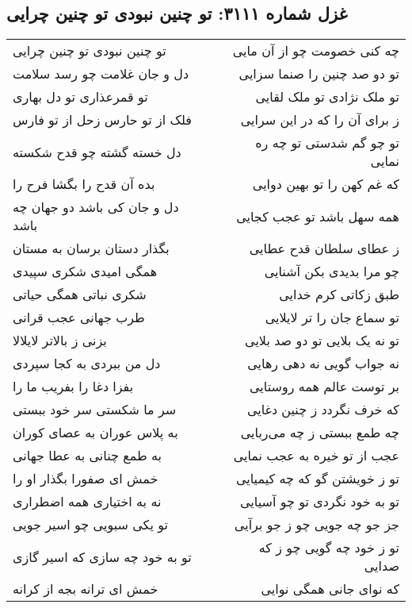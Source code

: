\begin{center}
\section*{غزل شماره ۳۱۱۱: تو چنین نبودی تو چنین چرایی}
\label{sec:3111}
\begin{longtable}{l p{0.5cm} r}
تو چنین نبودی تو چنین چرایی
&&
چه کنی خصومت چو از آن مایی
\\
دل و جان غلامت چو رسد سلامت
&&
تو دو صد چنین را صنما سزایی
\\
تو قمرعذاری تو دل بهاری
&&
تو ملک نژادی تو ملک لقایی
\\
فلک از تو حارس زحل از تو فارس
&&
ز برای آن را که در این سرایی
\\
دل خسته گشته چو قدح شکسته
&&
تو چو گم شدستی تو چه ره نمایی
\\
بده آن قدح را بگشا فرح را
&&
که غم کهن را تو بهین دوایی
\\
دل و جان کی باشد دو جهان چه باشد
&&
همه سهل باشد تو عجب کجایی
\\
بگذار دستان برسان به مستان
&&
ز عطای سلطان قدح عطایی
\\
همگی امیدی شکری سپیدی
&&
چو مرا بدیدی بکن آشنایی
\\
شکری نباتی همگی حیاتی
&&
طبق زکاتی کرم خدایی
\\
طرب جهانی عجب قرانی
&&
تو سماع جان را تر لایلایی
\\
بزنی ز بالاتر لایلالا
&&
تو نه یک بلایی تو دو صد بلایی
\\
دل من ببردی به کجا سپردی
&&
نه جواب گویی نه دهی رهایی
\\
بفزا دغا را بفریب ما را
&&
بر توست عالم همه روستایی
\\
سر ما شکستی سر خود ببستی
&&
که خرف نگردد ز چنین دغایی
\\
به پلاس عوران به عصای کوران
&&
چه طمع ببستی ز چه می‌ربایی
\\
به طمع چنانی به عطا جهانی
&&
عجب از تو خیره به عجب نمایی
\\
خمش ای صفورا بگذار او را
&&
تو ز خویشتن گو که چه کیمیایی
\\
نه به اختیاری همه اضطراری
&&
تو به خود نگردی تو چو آسیایی
\\
تو یکی سبویی چو اسیر جویی
&&
جز جو چه جویی چو ز جو برآیی
\\
تو به خود چه سازی که اسیر گازی
&&
تو ز خود چه گویی چو ز که صدایی
\\
خمش ای ترانه بجه از کرانه
&&
که نوای جانی همگی نوایی
\\
\end{longtable}
\end{center}
